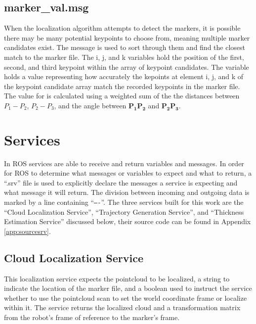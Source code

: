 \subsection{marker\_val.msg}
When the localization algorithm attempts to detect the markers, it is possible there may be many potential keypoints to choose from, meaning multiple marker candidates exist. The  message is used to sort through them and find the closest match to the marker file. The i, j, and k variables hold the position of the first, second, and third keypoint within the array of keypoint candidates. The  variable holds a value representing how accurately the kepoints at element i, j, and k of the keypoint candidate array match the recorded keypoints in the marker file. The value for  is calculated using a weighted sum of the the distances between $P_1-P_2$, $P_2-P_3$, and the angle between $\mathbf{P_1P_2}$ and $\mathbf{P_2P_3}$. \\

\section{Services}
In ROS services are able to receive and return variables and messages. In order for ROS to determine what messages or variables to expect and what to return, a ``.srv'' file is used to explicitly declare the messages a service is expecting and what message it will return. The division between incoming and outgoing data is marked by a line containing ``\texttt{----}''. The three services built for this work are the ``Cloud Localization Service'', ``Trajectory Generation Service'', and ``Thickness Estimation Service'' discussed below, their source code can be found in Appendix \ref{app:sourcesrv}.\\
\subsection{Cloud Localization Service}
This localization service expects the pointcloud to be localized, a string to indicate the location of the marker file, and a boolean used to instruct the service whether to use the pointcloud scan to set the world coordinate frame or localize within it. The service returns the localized cloud and a transformation matrix from the robot's frame of reference to the marker's frame.\\
%
  
